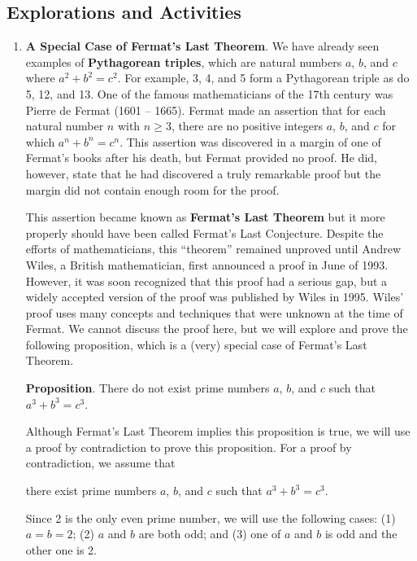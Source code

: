 \subsection*{Explorations and Activities}
\setcounter{oldenumi}{\theenumi}
\begin{enumerate} \setcounter{enumi}{\theoldenumi}
  \item \textbf{A Special Case of Fermat's Last Theorem}.  We have already seen examples of \textbf{Pythagorean triples},
%
which are natural numbers $a$, $b$, and $c$ where $a^2 + b^2 = c^2$.  For example, 3, 4, and 5 form a Pythagorean triple as do 5, 12, and 13.  One of the famous mathematicians of the 17th century was Pierre de Fermat (1601 -- 1665).
%
  Fermat made an assertion that for each natural number $n$ with $n \geq 3$, there are no positive integers $a$, $b$, and $c$ for which $a^n + b^n = c^n$.  This assertion was discovered in a margin of one of Fermat's books after his death, but Fermat provided no proof.  He did, however, state that he had discovered a truly remarkable proof but the margin did not contain enough room for the proof.  

This assertion became known as \textbf{Fermat's Last Theorem} 
%
but it more properly should have been called Fermat's Last Conjecture.  Despite the efforts of mathematicians, this ``theorem'' remained unproved until Andrew Wiles, a British mathematician, first announced a proof in June of 1993.  However, it was soon recognized that this proof had a serious gap, but a widely accepted version of the proof was published by Wiles in 1995.  Wiles' proof uses many concepts and techniques that were unknown at the time of Fermat.  We cannot discuss the proof here, but we will explore and prove the following proposition, which is a (very) special case of Fermat's Last Theorem.  

\noindent
\textbf{Proposition}.  There do not exist prime numbers $a$, $b$, and $c$ such that \newline $a^3 + b^3 = c^3$.

Although Fermat's Last Theorem implies this proposition is true, we will use a proof by contradiction to prove this proposition.  For a proof by contradiction, we assume that
\begin{center}
there exist prime numbers $a$, $b$, and $c$ such that $a^3 + b^3 = c^3$.
\end{center}
Since 2 is the only even prime number, we will use the following cases:  (1) $a = b = 2$; (2) $a$ and $b$ are both odd; and (3) one of $a$ and $b$ is odd and the other one is 2.


\end{enumerate}
